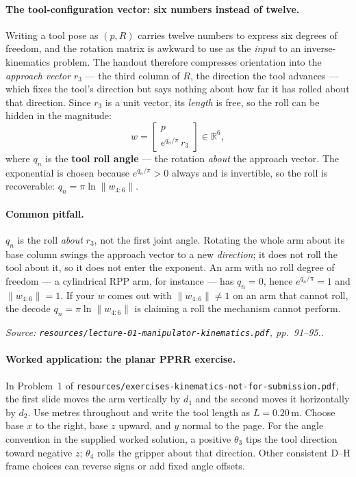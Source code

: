 \documentclass[11pt,a4paper]{article}
\renewcommand{\texttt}[1]{\nolinkurl{#1}}
\newcommand{\source}[1]{\par\smallskip\noindent\textit{Source: #1.}\par\smallskip}
\begin{document}
\paragraph{The tool-configuration vector: six numbers instead of twelve.}
Writing a tool pose as $(p,R)$ carries twelve numbers to express six degrees of freedom, and the
rotation matrix is awkward to use as the \emph{input} to an inverse-kinematics problem. The handout
therefore compresses orientation into the \emph{approach vector} $r_3$ --- the third column of $R$,
the direction the tool advances --- which fixes the tool's direction but says nothing about how far
it has rolled about that direction. Since $r_3$ is a unit vector, its \emph{length} is free, so the
roll can be hidden in the magnitude:
\[
 w=\begin{bmatrix}p\\[2pt] e^{q_n/\pi}\,r_3\end{bmatrix}\in\mathbb{R}^6 ,
\]
where $q_n$ is the \textbf{tool roll angle} --- the rotation \emph{about} the approach vector. The
exponential is chosen because $e^{q_n/\pi}>0$ always and is invertible, so the roll is recoverable:
$q_n=\pi\ln\lVert w_{4:6}\rVert$.

\paragraph{Common pitfall.}
$q_n$ is the roll \emph{about} $r_3$, not the first joint angle. Rotating the whole arm about its
base column swings the approach vector to a new \emph{direction}; it does not roll the tool about
it, so it does not enter the exponent. An arm with no roll degree of freedom --- a cylindrical
RPP arm, for instance --- has $q_n=0$, hence $e^{q_n/\pi}=1$ and $\lVert w_{4:6}\rVert=1$. If your
$w$ comes out with $\lVert w_{4:6}\rVert\ne 1$ on an arm that cannot roll, the decode
$q_n=\pi\ln\lVert w_{4:6}\rVert$ is claiming a roll the mechanism cannot perform.
\source{\texttt{resources/lecture-01-manipulator-kinematics.pdf}, pp.~91--95.}

\paragraph{Worked application: the planar PPRR exercise.}
In Problem~1 of \texttt{resources/exercises-kinematics-not-for-submission.pdf}, the first slide moves the arm vertically by $d_1$ and the second moves it horizontally by $d_2$. Use metres throughout and write the tool length as $L=0.20\,\mathrm m$. Choose base $x$ to the right, base $z$ upward, and $y$ normal to the page. For the angle convention in the supplied worked solution, a positive $\theta_3$ tips the tool direction toward negative $z$; $\theta_4$ rolls the gripper about that direction. Other consistent D--H frame choices can reverse signs or add fixed angle offsets.
\end{document}

